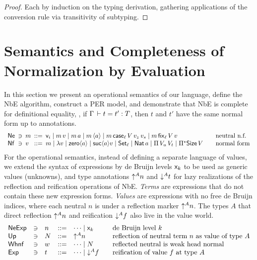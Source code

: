 \documentclass[acmsmall%
]{acmart}\settopmatter{printfolios=true}
\begin{document}
\begin{proof}
  Each by induction on the typing derivation, gathering applications of the conversion rule via transitivity of subtyping.
\end{proof}



\section{Semantics and Completeness of Normalization by Evaluation}
\label{sec:sem}

In this section we present an operational semantics of our language,
define the NbE algorithm, construct a PER model, and demonstrate that
NbE is complete for definitional equality, \ie, if
$\Gamma \,\vdash t = t' : T$, then $t$ and $t'$ have the same normal form
up to annotations.
\[
\begin{array}{l@{~\,}l@{~\,}l@{~\,}l@{~\,}l@{\qquad}l}
  \Ne & \ni &
  m & ::= & \ind i \mid m\,v \mid m\,a \mid m\,\ann a \mid
            m\,\case[\ell] V{v_z}{v_s} \mid m\,\fix[\ell] V v
    & \mbox{neutral n.f.} \\
  \Nf & \ni &
  v & ::= & m \mid \lambda v \mid \zero a \mid \suc a v \mid
            \Set[\ell] \mid \Nat a \mid \piT {V_u}{V_t} \mid
            \epiT\Size V
    & \mbox{normal form} \\
\end{array}
\]
For the operational semantics,
instead of defining a separate language of values,
we extend the syntax of expressions by de Bruijn levels $\mathsf{x}_{k}$
to be used as generic values (unknowns), and type annotations
$\mathord{\uparrow^{A}} n$ and $\mathord{\downarrow^{A}} t$ for lazy realizations of the
reflection and reification operations of NbE.
\emph{Terms} are expressions that do not contain these new expression
forms. \emph{Values}  are expressions with no free de Bruijn
indices, where each neutral $n$ is under a reflection marker $\mathord{\uparrow^{A}} n$.
The types $A$ that direct reflection $\mathord{\uparrow^{A}} n$ and reification
$\mathord{\downarrow^{A}} f$ also live in the value world.
\[
\begin{array}{lllrl@{\qquad}l}
  \NeExp & \ni & n & ::= & \dots \mid \lev k
    & \mbox{de Bruijn level $k$} \\
  \tUp  & \ni & N & ::= & \up A n
     & \mbox{reflection of neutral term $n$ as value of type $A$} \\
  \Whnf & \ni & w & ::= & \dots \mid N
    & \mbox{reflected neutral is weak head normal} \\
  \Exp  & \ni & t & ::= & \dots \mid \down A f
     & \mbox{reification of value $f$ at type $A$} \\
\end{array}
\]
\end{document}
